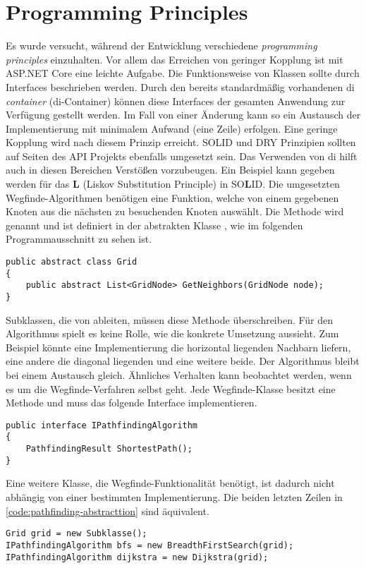 \part{Programming Principles} \label{part:programming-principles}
Es wurde versucht, während der Entwicklung
verschiedene \textit{programming principles} einzuhalten.
Vor allem das Erreichen von geringer Kopplung ist mit
ASP.NET Core eine leichte Aufgabe.
Die Funktionsweise von Klassen sollte durch Interfaces beschrieben werden.
Durch den bereits standardmäßig vorhandenen \acl{di} \textit{container} (\acs{di}-Container)
können diese Interfaces der gesamten Anwendung zur Verfügung gestellt werden.
Im Fall von einer Änderung kann so ein Austausch der
Implementierung mit minimalem Aufwand (eine Zeile) erfolgen.
Eine geringe Kopplung wird nach diesem Prinzip erreicht.
SOLID und DRY Prinzipien sollten auf Seiten des API Projekts ebenfalls umgesetzt sein.
Das Verwenden von \acs{di} hilft auch in diesen Bereichen Verstößen vorzubeugen.
Ein Beispiel kann gegeben werden für das \textbf{L} (Liskov Substitution Principle)
in SO\textbf{L}ID. Die umgesetzten Wegfinde-Algorithmen benötigen eine
Funktion, welche von einem gegebenen Knoten aus die nächsten zu besuchenden
Knoten auswählt. Die Methode wird 
genannt und ist definiert in der abstrakten Klasse ,
wie im folgenden Programmausschnitt zu sehen ist.

\begin{lstlisting}[caption={\textbf{Grid} Entität},label={code:grid-entity}]
public abstract class Grid
{
    public abstract List<GridNode> GetNeighbors(GridNode node);
}
\end{lstlisting}
Subklassen, die von  ableiten, müssen diese Methode überschreiben.
Für den Algorithmus spielt es keine Rolle, wie die konkrete Umsetzung aussieht.
Zum Beispiel könnte eine Implementierung die horizontal liegenden Nachbarn liefern,
eine andere die diagonal liegenden und eine weitere beide. Der Algorithmus bleibt
bei einem Austausch gleich. Ähnliches Verhalten kann
beobachtet werden, wenn es um die Wegfinde-Verfahren selbst geht.
Jede Wegfinde-Klasse besitzt eine Methode 
und muss das folgende Interface implementieren.
\begin{lstlisting}[caption={Wegfinde-Algorithmus Interface},label={code:i-pathfinding}]
public interface IPathfindingAlgorithm
{
    PathfindingResult ShortestPath();
}
\end{lstlisting}
Eine weitere Klasse, die Wegfinde-Funktionalität benötigt, ist dadurch nicht abhängig
von einer bestimmten Implementierung. Die beiden letzten Zeilen
in \autoref{code:pathfinding-abstracttion} sind äquivalent.
\newpage
\begin{lstlisting}[caption={Abstraktion der Wegfinde-Algorithmen},
label={code:pathfinding-abstracttion}]
Grid grid = new Subklasse();
IPathfindingAlgorithm bfs = new BreadthFirstSearch(grid);
IPathfindingAlgorithm dijkstra = new Dijkstra(grid);
\end{lstlisting}
